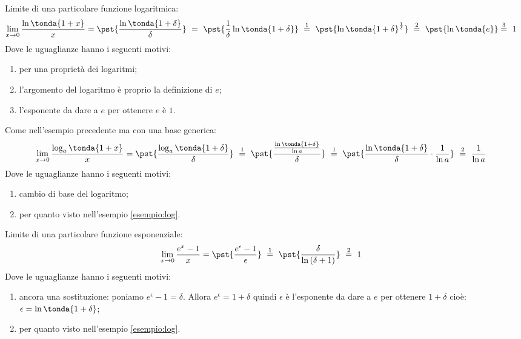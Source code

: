 \begin{esempio}
\label{esempio:log}
Limite di una particolare funzione logaritmica:
\begin{align*}
 \lim_{x \rightarrow 0} \dfrac{\ln\tonda{1+x}}{x} &=
 \pst{\dfrac{\ln\tonda{1+\delta}}{\delta}}~ = ~  
 \pst{\frac{1}{\delta}\ln\tonda{1+\delta}} ~\stackrel{1}{=} ~
 \pst{\ln\tonda{1+\delta}^\frac{1}{\delta}}
~ \stackrel{2}{=} ~
\pst{\ln\tonda{e}} \stackrel{3}{=} ~ 1
\end{align*}
Dove le uguaglianze hanno i seguenti motivi:
\begin{enumerate} [nosep]
 \item per una proprietà dei logaritmi;
 \item l'argomento del logaritmo è proprio la definizione di \(e\);
 \item l'esponente da dare a \(e\) per ottenere \(e\) è \(1\).
\end{enumerate}
\end{esempio}

\begin{esempio}
Come nell'esempio precedente ma con una base generica:
\begin{align*}
 \lim_{x \rightarrow 0} \dfrac{\log_a\tonda{1+x}}{x} &=
 \pst{\dfrac{\log_a\tonda{1+\delta}}{\delta}}~\stackrel{1}{=} ~  
 \pst{\dfrac{\frac{\ln\tonda{1+\delta}}{\ln a}}{\delta}}~\stackrel{1}{=} ~
 \pst{\dfrac{\ln\tonda{1+\delta}}{\delta}\cdot \dfrac{1}{\ln a}}
 ~ \stackrel{2}{=} ~
 \dfrac{1}{\ln a}
\end{align*}
Dove le uguaglianze hanno i seguenti motivi:
\begin{enumerate} [nosep]
 \item cambio di base del logaritmo;
 \item per quanto visto nell'esempio \ref{esempio:log}.
\end{enumerate}
\end{esempio}

\begin{esempio}
Limite di una particolare funzione esponenziale:
\begin{align*}
\lim_{x \rightarrow 0} \dfrac{e^x-1}{x} &=
\pst{\dfrac{e^\epsilon-1}{\epsilon}}
~ \stackrel{1}{=} ~  
\pst{\dfrac{\delta}{\ln{(\delta+1)}}}~ \stackrel{2}{=} ~ 1
\end{align*}
Dove le uguaglianze hanno i seguenti motivi:
\begin{enumerate} [nosep]
 \item ancora una sostituzione: poniamo \(e^\epsilon-1=\delta\). 
Allora \(e^\epsilon = 1+\delta\) quindi \(\epsilon\) è l'esponente da dare 
a \(e\) per ottenere \(1+\delta\) cioè: 
\(\epsilon = \ln{\tonda{1+\delta}}\);
 \item per quanto visto nell'esempio \ref{esempio:log}.
\end{enumerate}
\end{esempio}

